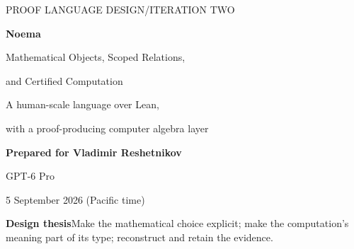 \documentclass[11pt,a4paper]{article}
\newcommand{\Noema}{\textsc{Noema}}
\theoremstyle{remark}\newtheorem{example}[proposition]{Example}
\begin{document}
\begin{titlepage}
\vspace*{18mm}
{\large\color{accent} PROOF LANGUAGE DESIGN\quad /\quad ITERATION TWO}\par
\vspace{12mm}
{\Huge\bfseries\color{ink} Noema}\par
\vspace{5mm}
{\LARGE Mathematical Objects, Scoped Relations,\par and Certified Computation}\par
\vspace{10mm}
{\large A human-scale language over Lean,\par with a proof-producing computer algebra layer}\par
\vspace{13mm}
\textbf{Prepared for Vladimir Reshetnikov}\par
GPT-6 Pro\par
5 September 2026 (Pacific time)
\vspace{12mm}
\begin{abstract}
A mathematician alternates between choosing objects, recognizing a structure, applying a theorem, and calculating. A useful proof language should support that entire cycle, not merely replace tactic names with English. This article proposes \Noema, a conservative extension of the common architecture identified by the two Brainstorm syntheses: Lean remains the checking foundation; mathematical choices remain visible; routine consequences acquire retained evidence.

The principal extension is a \emph{contract calculus for symbolic computation}. A computation returns an object together with the precise relation it establishes, its domain and precision, and checkable evidence. Equality, equality on an open set, agreement of finitely many coefficients, and numerical enclosure are different results, not different displays of one equality. Definition packages connect mathematical specifications to computational representations through proved interfaces. A verified reference algorithm or a verified certificate checker supplies the logical basis of each computational service; an external CAS or Leant may search without becoming an oracle.

The proposal develops surface syntax, dependent obligation interfaces, guarded view composition, a two-path CAS architecture, a Leant integration contract, six mathematical case studies, and explicit answers to the syntheses' next-round questions. A small accompanying Python experiment exercises 25 certificate-boundary tests with exact rational arithmetic. It is not a formally verified implementation. The proposed language has not been implemented or compiled, and no new Lean or Leant execution is claimed.
\end{abstract}
\vfill
{\small\color{ink}\textbf{Design thesis}\quad Make the mathematical choice explicit; make the computation's meaning part of its type; reconstruct and retain the evidence.}
\end{titlepage}
\begingroup\small\setlength{\parskip}{0pt}
\tableofcontents
\endgroup
\clearpage
\end{document}
